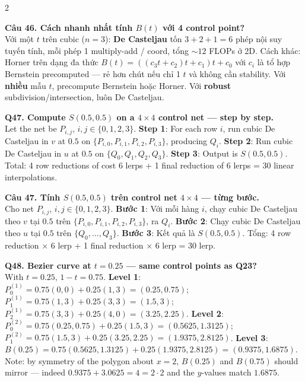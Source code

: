 \begin{paracol}{2}
\switchcolumn

\textbf{Câu 46. Cách nhanh nhất tính $B(t)$ với 4 control point?}\\
Với một $t$ trên cubic ($n=3$): \textbf{De Casteljau} tốn $3{+}2{+}1=6$ phép nội suy tuyến tính, mỗi phép 1 multiply-add / coord, tổng $\sim 12$ FLOPs ở 2D. Cách khác: Horner trên dạng đa thức $B(t)=((c_3 t + c_2) t + c_1) t + c_0$ với $c_i$ là tổ hợp Bernstein precomputed — rẻ hơn chút nếu chỉ 1 $t$ và không cần stability. Với \textbf{nhiều} mẫu $t$, precompute Bernstein hoặc Horner. Với \textbf{robust} subdivision/intersection, luôn De Casteljau.

\switchcolumn*

\textbf{Q47. Compute $S(0.5, 0.5)$ on a $4\times 4$ control net — step by step.}\\
Let the net be $P_{i,j}$, $i,j\in\{0,1,2,3\}$. \textbf{Step 1}: For each row $i$, run cubic De Casteljau in $v$ at $0.5$ on $\{P_{i,0},P_{i,1},P_{i,2},P_{i,3}\}$, producing $Q_i$. \textbf{Step 2}: Run cubic De Casteljau in $u$ at $0.5$ on $\{Q_0, Q_1, Q_2, Q_3\}$. \textbf{Step 3}: Output is $S(0.5, 0.5)$. Total: 4 row reductions of cost 6 lerps + 1 final reduction of 6 lerps = 30 linear interpolations.

\switchcolumn

\textbf{Câu 47. Tính $S(0.5, 0.5)$ trên control net $4\times 4$ — từng bước.}\\
Cho net $P_{i,j}$, $i,j\in\{0,1,2,3\}$. \textbf{Bước 1}: Với mỗi hàng $i$, chạy cubic De Casteljau theo $v$ tại $0.5$ trên $\{P_{i,0},P_{i,1},P_{i,2},P_{i,3}\}$, ra $Q_i$. \textbf{Bước 2}: Chạy cubic De Casteljau theo $u$ tại $0.5$ trên $\{Q_0,\ldots,Q_3\}$. \textbf{Bước 3}: Kết quả là $S(0.5, 0.5)$. Tổng: 4 row reduction × 6 lerp + 1 final reduction × 6 lerp = 30 lerp.

\switchcolumn*

\textbf{Q48. Bezier curve at $t=0.25$ — same control points as Q23?}\\
With $t=0.25$, $1-t=0.75$.
\textbf{Level 1}: $P_0^{(1)}=0.75(0,0)+0.25(1,3)=(0.25, 0.75)$; $P_1^{(1)}=0.75(1,3)+0.25(3,3)=(1.5, 3)$; $P_2^{(1)}=0.75(3,3)+0.25(4,0)=(3.25, 2.25)$.
\textbf{Level 2}: $P_0^{(2)}=0.75(0.25,0.75)+0.25(1.5,3)=(0.5625, 1.3125)$; $P_1^{(2)}=0.75(1.5,3)+0.25(3.25,2.25)=(1.9375, 2.8125)$.
\textbf{Level 3}: $B(0.25)=0.75(0.5625,1.3125)+0.25(1.9375,2.8125)=(0.9375, 1.6875)$.
Note: by symmetry of the polygon about $x=2$, $B(0.25)$ and $B(0.75)$ should mirror — indeed $0.9375 + 3.0625 = 4 = 2\cdot 2$ and the $y$-values match $1.6875$. \checkmark


\end{paracol}
